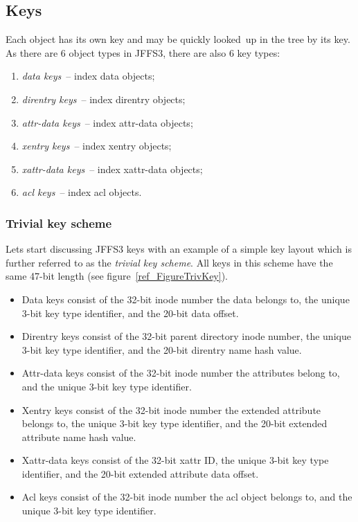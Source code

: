 %
%
\subsection{Keys} \label{ref_SectionKeys}

Each object has its own key and may be quickly looked~up in the tree by its
key. As there are 6 object types in JFFS3, there are also 6 key types:

\begin{enumerate}
\item \emph{data keys}~-- index data objects;
\item \emph{direntry keys}~-- index direntry objects;
\item \emph{attr-data keys}~-- index attr-data objects;
\item \emph{xentry keys}~-- index xentry objects;
\item \emph{xattr-data keys}~-- index xattr-data objects;
\item \emph{acl keys}~-- index acl objects.
\end{enumerate}

%
%
\subsubsection{Trivial key scheme}

Lets start discussing JFFS3 keys with an example of a simple key layout which
is further referred to as the \emph{trivial key scheme}. All keys in this
scheme have the same \mbox{47-bit} length (see figure~\ref{ref_FigureTrivKey}). 

\begin{itemize}

\item Data keys consist of the \mbox{32-bit} inode number the data belongs to,
the unique \mbox{3-bit} key type identifier, and the \mbox{20-bit} data offset.

\item Direntry keys consist of the \mbox{32-bit} parent directory inode number,
the unique \mbox{3-bit} key type identifier, and the \mbox{20-bit} direntry
name hash value.

\item Attr-data keys consist of the \mbox{32-bit} inode number the attributes
belong to, and the unique \mbox{3-bit} key type identifier.

\item Xentry keys consist of the \mbox{32-bit} inode number the extended
attribute belongs to, the unique \mbox{3-bit} key type identifier, and the
\mbox{20-bit} extended attribute name hash value.

\item Xattr-data keys consist of the \mbox{32-bit} xattr ID, the unique
\mbox{3-bit} key type identifier, and the \mbox{20-bit} extended attribute data
offset.

\item Acl keys consist of the \mbox{32-bit} inode number the acl object belongs
to, and the unique \mbox{3-bit} key type identifier.

\end{itemize}

